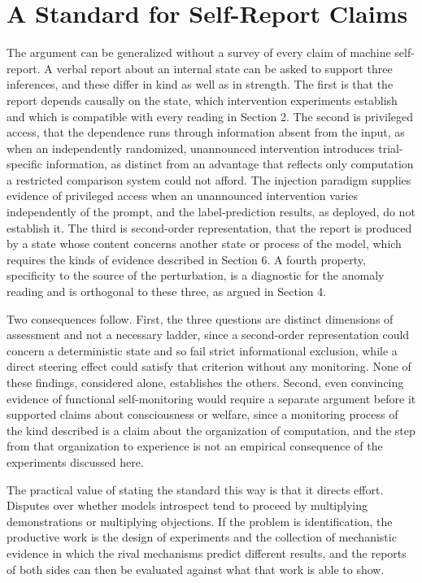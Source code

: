 \documentclass[11pt]{article}
\theoremstyle{definition}
\theoremstyle{remark}
\begin{document}
\section{A Standard for Self-Report Claims}

The argument can be generalized without a survey of every claim of machine self-report. A verbal report about an internal state can be asked to support three inferences, and these differ in kind as well as in strength. The first is that the report depends causally on the state, which intervention experiments establish and which is compatible with every reading in Section 2. The second is privileged access, that the dependence runs through information absent from the input, as when an independently randomized, unannounced intervention introduces trial-specific information, as distinct from an advantage that reflects only computation a restricted comparison system could not afford. The injection paradigm supplies evidence of privileged access when an unannounced intervention varies independently of the prompt, and the label-prediction results, as deployed, do not establish it. The third is second-order representation, that the report is produced by a state whose content concerns another state or process of the model, which requires the kinds of evidence described in Section 6. A fourth property, specificity to the source of the perturbation, is a diagnostic for the anomaly reading and is orthogonal to these three, as argued in Section 4.

Two consequences follow. First, the three questions are distinct dimensions of assessment and not a necessary ladder, since a second-order representation could concern a deterministic state and so fail strict informational exclusion, while a direct steering effect could satisfy that criterion without any monitoring. None of these findings, considered alone, establishes the others. Second, even convincing evidence of functional self-monitoring would require a separate argument before it supported claims about consciousness or welfare, since a monitoring process of the kind described is a claim about the organization of computation, and the step from that organization to experience is not an empirical consequence of the experiments discussed here.

The practical value of stating the standard this way is that it directs effort. Disputes over whether models introspect tend to proceed by multiplying demonstrations or multiplying objections. If the problem is identification, the productive work is the design of experiments and the collection of mechanistic evidence in which the rival mechanisms predict different results, and the reports of both sides can then be evaluated against what that work is able to show.
\end{document}
